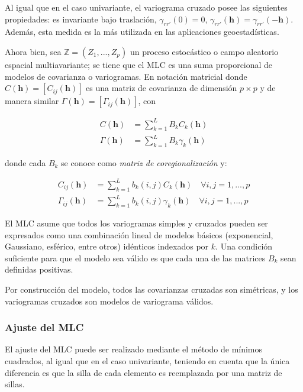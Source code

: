 \documentclass[
]{book}
\begin{document}
Al igual que en el caso univariante, el variograma cruzado posee las siguientes propiedades: es invariante bajo traslación, \(\gamma_{rr'}(0)=0\), \(\gamma_{rr'}(\textbf{h})=\gamma_{rr'}(-\textbf{h})\). Además, esta medida es la más utilizada en las aplicaciones geoestadísticas.

Ahora bien, sea \(\mathbb{Z}=(Z_1,...,Z_p)\) un proceso estocástico o campo aleatorio espacial multiavariante; se tiene que el MLC es una suma proporcional de modelos de covarianza o variogramas. En notación matricial donde \(C(\textbf{h})=[C_{ij}(\textbf{h})]\) es una matriz de covarianza de dimensión \(p\times p\) y de manera similar \(\Gamma(\textbf{h})=[\Gamma_{ij}(\textbf{h})]\), con

\begin{align}
    C(\textbf{h})&=\sum_{k=1}^{L}B_kC_k(\textbf{h})\\
    \Gamma(\textbf{h})&=\sum_{k=1}^LB_k\gamma_k(\textbf{h})
\end{align}

donde cada \(B_k\) se conoce como \textit{matriz de coregionalización} y:

\begin{align}
    C_{ij}(\textbf{h})&=\sum_{k=1}^Lb_k(i,j)C_k(\textbf{h})\quad \forall i,j=1,...,p\\
    \Gamma_{ij}(\textbf{h})&=\sum_{k=1}^Lb_k(i,j)\gamma_k(\textbf{h})\quad \forall i,j=1,...,p
\end{align}

El MLC asume que todos los variogramas simples y cruzados pueden ser expresados como una combinación lineal de modelos básicos (exponencial, Gaussiano, esférico, entre otros) idénticos indexados por \(k\). Una condición suficiente para que el modelo sea válido es que cada una de las matrices \(B_k\) sean definidas positivas.

Por construcción del modelo, todos las covarianzas cruzadas son simétricas, y los variogramas cruzados son modelos de variograma válidos.

\hypertarget{ajuste-del-mlc}{%
\subsubsection*{Ajuste del MLC}\label{ajuste-del-mlc}}

El ajuste del MLC puede ser realizado mediante el método de mínimos cuadrados, al igual que en el caso univariante, teniendo en cuenta que la única diferencia es que la silla de cada elemento es reemplazada por una matriz de sillas.
\end{document}
